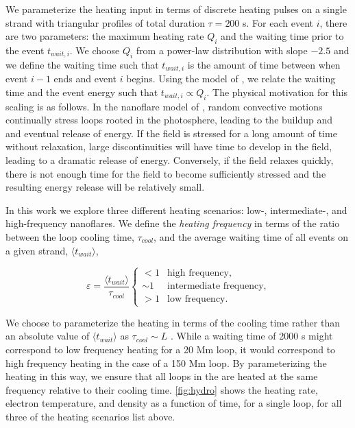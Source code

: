 We parameterize the heating input in terms of discrete heating pulses on a single strand with triangular profiles of total duration $\tau=200$ s. For each event $i$, there are two parameters: the maximum heating rate $Q_i$ and the waiting time prior to the event $t_{wait,i}$. We choose $Q_i$ from a power-law distribution with slope $-2.5$ and we define the waiting time such that $t_{wait,i}$ is the amount of time between when event $i-1$ ends and event $i$ begins. Using the model of \citet{cargill_active_2014}, we relate the waiting time and the event energy such that $t_{wait,i}\propto Q_i$. The physical motivation for this scaling is as follows. In the nanoflare model of \citet{parker_nanoflares_1988}, random convective motions continually stress loops rooted in the photosphere, leading to the buildup and and eventual release of energy. If the field is stressed for a long amount of time without relaxation, large discontinuities will have time to develop in the field, leading to a dramatic release of energy. Conversely, if the field relaxes quickly, there is not enough time for the field to become sufficiently stressed and the resulting energy release will be relatively small. 

In this work we explore three different heating scenarios: low-, intermediate-, and high-frequency nanoflares. We define the \textit{heating frequency} in terms of the ratio between the loop cooling time, $\tau_{cool}$, and the average waiting time of all events on a given strand, $\langle t_{wait}\rangle$,

\begin{equation}\label{eq:heating_types}
    \varepsilon = \frac{\langle t_{wait}\rangle}{\tau_{cool}}
    \begin{cases} 
        < 1 &  \text{high frequency},\\
        \sim1 & \text{intermediate frequency}, \\
        > 1 & \text{low frequency}.
     \end{cases}
\end{equation}

We choose to parameterize the heating in terms of the cooling time rather than an absolute value of $\langle t_{wait}\rangle$ as $\tau_{cool}\sim L$ \citep[see appendix]{cargill_active_2014}. While a waiting time of 2000 s might correspond to low frequency heating for a 20 Mm loop, it would correspond to high frequency heating in the case of a 150 Mm loop. By parameterizing the heating in this way, we ensure that all loops in the \AR{} are heated at the same frequency relative to their cooling time. \autoref{fig:hydro} shows the heating rate, electron temperature, and density as a function of time, for a single loop, for all three of the heating scenarios list above. 

